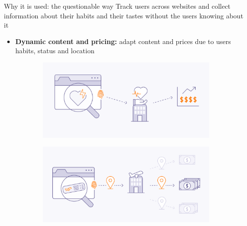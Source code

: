 \begin{frame}{Why it is used: the questionable way}
  \vspace{-0.5cm}
  Track users across websites and collect information about their habits and their tastes without the users knowing about it
  \vspace{0.5cm}
  \begin{itemize}
    \item \textbf{Dynamic content and pricing:} adapt content and prices due to users habits, status and location
  \end{itemize}
  \vspace{0.5cm}
  \begin{figure}
    \centering
    \begin{subfigure}{0.45\textwidth}
      \includegraphics[width=\linewidth]{images/health.png}
    \end{subfigure}
    \begin{subfigure}{0.45\textwidth}
      \includegraphics[width=\linewidth]{images/flight.png}
    \end{subfigure}
  \end{figure}
\end{frame}


